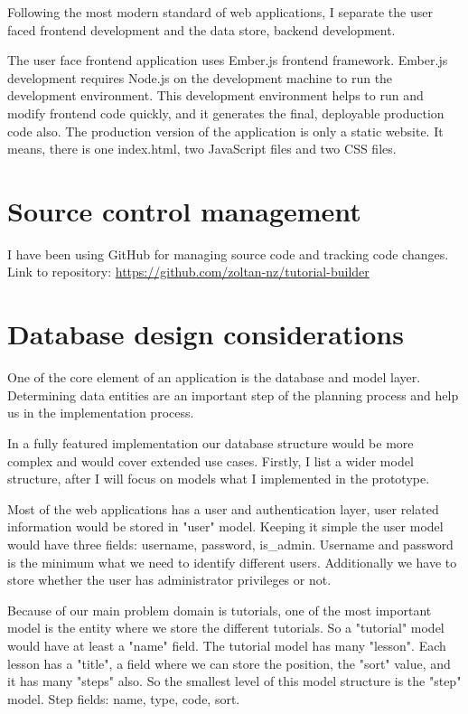 \documentclass[12pt, a4paper, oneside, openright, medskipamount]{report}
\begin{document}
Following the most modern standard of web applications, I separate the user faced frontend development and the data store, backend development.

The user face frontend application uses Ember.js frontend framework. Ember.js development requires Node.js on the development machine to run the development environment. This development environment helps to run and modify frontend code quickly, and it generates the final, deployable production code also. The production version of the application is only a static website. It means, there is one index.html, two JavaScript files and two CSS files.

\section{Source control management}

I have been using GitHub for managing source code and tracking code changes. Link to repository: \url{https://github.com/zoltan-nz/tutorial-builder}

\section{Database design considerations}

One of the core element of an application is the database and model layer. Determining data entities are an important step of the planning process and help us in the implementation process.

In a fully featured implementation our database structure would be more complex and would cover extended use cases. Firstly, I list a wider model structure, after I will focus on models what I implemented in the prototype.

Most of the web applications has a user and authentication layer, user related information would be stored in "user" model. Keeping it simple the user model would have three fields: username, password, is\_admin. Username and password is the minimum what we need to identify different users. Additionally we have to store whether the user has administrator privileges or not.

Because of our main problem domain is tutorials, one of the most important model is the entity where we store the different tutorials. So a "tutorial" model would have at least a "name" field. The tutorial model has many "lesson". Each lesson has a "title", a field where we can store the position, the "sort" value, and it has many "steps" also. So the smallest level of this model structure is the "step" model. Step fields: name, type, code, sort.
\end{document}
